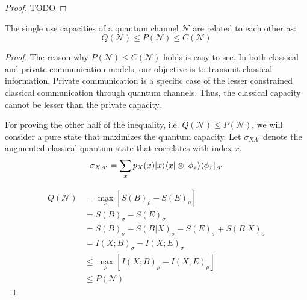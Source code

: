 \begin{proof}
TODO
\end{proof}

\begin{theorem}
The single use capacities of a quantum channel $\mathcal{N}$ are related to each other as:
$$Q(\mathcal{N}) \leq P(\mathcal{N}) \leq C(\mathcal{N})$$
\end{theorem}

\begin{proof}
The reason why $P(\mathcal{N}) \leq C(\mathcal{N})$ holds is easy to see. In both classical and private communication models, our objective is to transmit classical information. Private communication is a specific case of the lesser constrained classical communication through quantum channels. Thus, the classical capacity cannot be lesser than the private capacity.

For proving the other half of the inequality, i.e. $Q(\mathcal{N}) \leq P(\mathcal{N})$, we will consider a pure state that maximizes the quantum capacity. Let $\sigma_{XA'}$ denote the augmented classical-quantum state that correlates with index $x$.
$$\sigma_{XA'} = \sum_{x} p_X(x) \lvert x\rangle\langle x\rvert \otimes \lvert\phi_x\rangle\langle\phi_x\rvert_{A'}$$

\begin{align*}
Q(\mathcal{N}) &= \max_{\rho} \left[ S(B)_{\rho} - S(E)_{\rho} \right] \\
&= S(B)_{\sigma} - S(E)_{\sigma}\\
&= S(B)_{\sigma} - S(B|X)_{\sigma} - S(E)_{\sigma} + S(B|X)_{\sigma}\\
&= I(X;B)_{\sigma} - I(X;E)_{\sigma} \\
&\leq \max_{\rho} \left[ I(X;B)_{\rho} - I(X;E)_{\rho} \right] \\
&\leq P(\mathcal{N})
\end{align*}
\end{proof}
